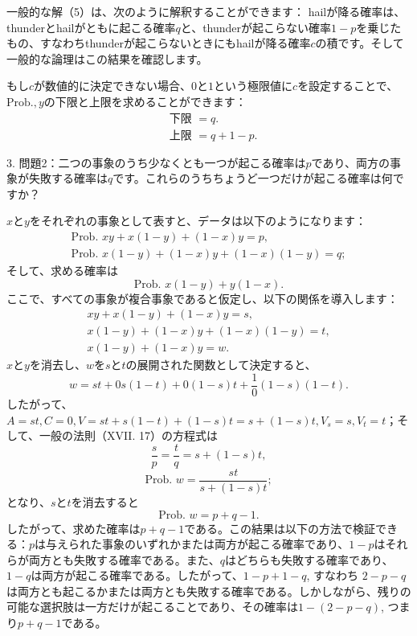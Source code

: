 \documentclass[a4paper,11pt,openany]{ltjsbook}
\begin{document}
一般的な解（5）は、次のように解釈することができます： hailが降る確率は、thunderとhailがともに起こる確率$q$と、thunderが起こらない確率$1-p$を乗じたもの、すなわちthunderが起こらないときにもhailが降る確率$c$の積です。そして一般的な論理はこの結果を確認します。

もし$c$が数値的に決定できない場合、$0$と$1$という極限値に$c$を設定することで、$\mathrm{Prob.},y$の下限と上限を求めることができます：
\begin{align*}
  &\text{下限 $= q$.}   \\
  &\text{上限 $= q + 1-p$.}
\end{align*}

3. 問題2：二つの事象のうち少なくとも一つが起こる確率は$p$であり、両方の事象が失敗する確率は$q$です。これらのうちちょうど一つだけが起こる確率は何ですか？

$x$と$y$をそれぞれの事象として表すと、データは以下のようになります：
\[
\begin{array}{cccccc}
\text{Prob. }xy + x(1-y) + (1-x)y = p, \\
\text{Prob. }x(1-y) + (1-x)y + (1-x)(1-y) = q;
\end{array}
\]
そして、求める確率は
\[
\text{Prob. }x(1-y) + y(1-x).
\]
ここで、すべての事象が複合事象であると仮定し、以下の関係を導入します：
\[
\begin{array}{cccccc}
xy + x(1-y) + (1-x)y = s, \\
x(1-y) + (1-x)y + (1-x)(1-y) = t, \\
x(1-y) + (1-x)y = w.
\end{array}
\]
$x$と$y$を消去し、$w$を$s$と$t$の展開された関数として決定すると、
\[w = st + 0 s(1-t) + 0 (1-s)t + \frac{1}{0} (1-s)(1-t).\]
したがって、$A = st, C=0, V=st + s(1-t) + (1-s)t = s + (1-s)t,
V_s=s, V_t=t$；そして、一般の法則（XVII. 17）の方程式は
\begin{equation}
\frac{s}{p} = \frac{t}{q} = s + (1-s)t, \tag{1}
\end{equation}
\[
\text{Prob. }w = \frac{st}{s + (1-s)t};
\]
となり、$s$と$t$を消去すると
\[
\text{Prob. }w = p + q - 1.
\]
したがって、求めた確率は$p + q - 1$である。この結果は以下の方法で検証できる：$p$は与えられた事象のいずれかまたは両方が起こる確率であり、$1-p$はそれらが両方とも失敗する確率である。また、$q$はどちらも失敗する確率であり、$1-q$は両方が起こる確率である。したがって、$1-p + 1-q$, すなわち $2-p-q$は両方とも起こるかまたは両方とも失敗する確率である。しかしながら、残りの可能な選択肢は一方だけが起こることであり、その確率は$1-(2-p-q)$, つまり$p + q - 1$である。
\end{document}
